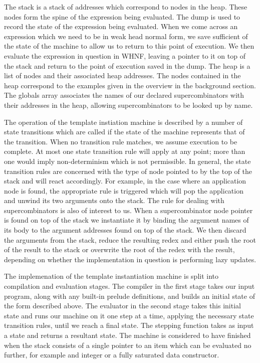 \noindent The stack is a stack of addresses which correspond
to nodes in the heap. These nodes form the spine of the 
expression being evaluated. The dump is used to record the
state of the expression being evaluated. When we come across
an expression which we need to be in weak head normal form, 
we save sufficient of the state of the machine to allow us to
return to this point of execution. We then evaluate the expression
in question in WHNF, leaving a pointer to it on top of the stack
and return to the point of execution saved in the dump.
The heap is a list of nodes and their associated heap addresses.
The nodes contained in the heap correspond to the examples
given in the overview in the background section.
The globals array associates the names of our declared
supercombinators with their addresses in the heap, allowing
supercombinators to be looked up by name. 

The operation of the template instiation machine is described
by a number of state transitions which are called if the state
of the machine represents that of the transition. When no
transition rule matches, we assume execution to be complete. 
At most one state transition rule will apply at any point;
more than one would imply non-determinism which is not
permissible. In general, the state transition rules are
concerned with the type of node pointed to by the top of the
stack and will react accordingly. For example, in the case
where an application node is found, the appropriate rule
is triggered which will pop the application and unwind its
two arguments onto the stack. The rule for dealing with 
supercombinators is also of interest to us. When a 
supercombinator node pointer is found on top of the stack
we instantiate it by binding the argument names of its
body to the argument addresses found on top of the stack.
We then discard the arguments from the stack, reduce the
resulting redex and either push the root of the result 
to the stack or overwrite the root of the redex with the
result, depending on whether the implementation in question
is performing lazy updates. 

The implemenation of the template instantiation machine is
split into compilation and evaluation stages. The compiler
in the first stage takes our input program, along with
any built-in prelude definitions, and builds an initial
state of the form described above. The evaluator in the 
second stage takes this initial state and runs our machine
on it one step at a time, applying the necessary state
transition rules, until we reach a final state. The stepping
function takes as input a state and returns a resultant
state. The machine is considered to have finished when 
the stack consists of a single pointer to an item which
can be evaluated no further, for example and integer or
a fully saturated data constructor. 

